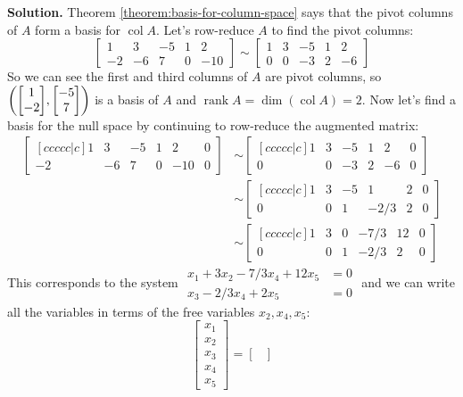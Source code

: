 \documentclass[11pt, letterpaper]{report}
\newenvironment{book}{}{}
\let\originalleft\left
\let\originalright\right
\renewcommand{\left}{\mathopen{}\mathclose\bgroup\originalleft}
\renewcommand{\right}{\aftergroup\egroup\originalright}
\newcounter{theorem}[chapter]
\DeclareMathOperator{\col}{col}
\DeclareMathOperator{\rank}{rank}
\newcommand{\bbvec}[2]{
  \begin{bmatrix} #1 \\ #2 \end{bmatrix}
}
\begin{document}
\begin{book}
\textbf{Solution.} Theorem \ref{theorem:basis-for-column-space} says that the pivot columns of $A$ form a basis for $\col A$. Let's row-reduce $A$ to find the pivot columns:
\[\begin{bmatrix}
1 & 3 & -5 & 1 & 2 \\
-2 & -6 & 7 & 0 & -10
\end{bmatrix} \sim \begin{bmatrix}
1 & 3 & -5 & 1 & 2 \\
0 & 0 & -3 & 2 & -6
\end{bmatrix}\]
So we can see the first and third columns of $A$ are pivot columns, so $\left( \bbvec{1}{-2}, \bbvec{-5}{7} \right)$ is a basis of $A$ and $\rank A = \dim (\col A) = 2$. Now let's find a basis for the null space by continuing to row-reduce the augmented matrix:
\begin{align*}
\begin{bmatrix}[ccccc|c]
1 & 3 & -5 & 1 & 2 & 0\\
-2 & -6 & 7 & 0 & -10 & 0
\end{bmatrix} &\sim \begin{bmatrix}[ccccc|c]
1 & 3 & -5 & 1 & 2 & 0\\
0 & 0 & -3 & 2 & -6 & 0
\end{bmatrix}\\ &\sim \begin{bmatrix}[ccccc|c]
1 & 3 & -5 & 1 & 2 & 0\\
0 & 0 & 1 & -2/3 & 2 & 0
\end{bmatrix}\\ &\sim \begin{bmatrix}[ccccc|c]
1 & 3 & 0 & -7/3 & 12 & 0\\
0 & 0 & 1 & -2/3 & 2 & 0
\end{bmatrix}
\end{align*}
This corresponds to the system $\begin{aligned}
x_1+3x_2-7/3x_4+12x_5 &=0 \\
x_3-2/3x_4+2x_5 &= 0
\end{aligned}$ and we can write all the variables in terms of the free variables $x_2,x_4,x_5$:
\[\begin{bmatrix}
x_1 \\ x_2 \\ x_3 \\ x_4 \\ x_5
\end{bmatrix}=\begin{bmatrix}

\end{bmatrix}\]
\end{book}
\end{document}
